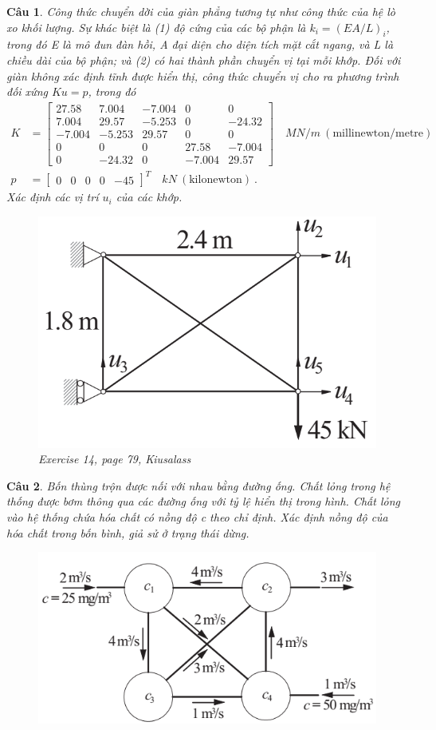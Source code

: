 \documentclass[11pt]{article}
\newtheorem{bt}{Câu}
\newcommand{\m}[1]{\begin{bmatrix}
		#1
\end{bmatrix}}
\begin{document}
\begin{bt}
Công thức chuyển dời của giàn phẳng tương tự như công thức của hệ lò xo khối lượng. Sự khác biệt là (1) độ cứng của các bộ phận là $k_i = (EA / L)_i$, trong đó E là mô đun đàn hồi, A đại diện cho diện tích mặt cắt ngang, và L là chiều dài của bộ phận; và (2) có hai thành phần chuyển vị tại mỗi khớp. Đối với giàn không xác định tĩnh được hiển thị, công thức chuyển vị cho ra phương trình đối xứng $Ku = p$, trong đó
\begin{align*}
K &=
\m{	27.58 & 7.004 &-7.004 &0 &0 \\
	7.004 &29.57& -5.253& 0 &-24.32 \\
	-7.004 &-5.253 &29.57& 0& 0 \\
	0& 0& 0& 27.58& -7.004 \\
	0& -24.32& 0 &-7.004& 29.57} \quad MN/m \ (\mbox{millinewton/metre}) \\
p &= \m{0 &0& 0& 0& -45}^T \quad kN \ (\mbox{kilonewton}) \ .
\end{align*}
Xác định các vị trí $u_i$ của các khớp.

\begin{figure}[h!]
	\centering
	\includegraphics[width=0.5\linewidth]{plane_truss}
	\caption{Exercise 14, page 79, Kiusalass}
	\label{fig:planetruss}
\end{figure}
\end{bt}


\begin{bt}
Bốn thùng trộn được nối với nhau bằng đường ống. Chất lỏng trong hệ thống được bơm thông qua các đường ống với tỷ lệ hiển thị trong hình. Chất lỏng vào hệ thống
chứa hóa chất có nồng độ c theo chỉ định. Xác định nồng độ của hóa chất trong bốn bình, giả sử ở trạng thái dừng.
\begin{figure}[h!]
	\centering
	\includegraphics[width=0.5\linewidth]{mixing_tank}
	\caption{}
	\label{fig:mixingtank}
\end{figure}
\end{bt}
\end{document}
